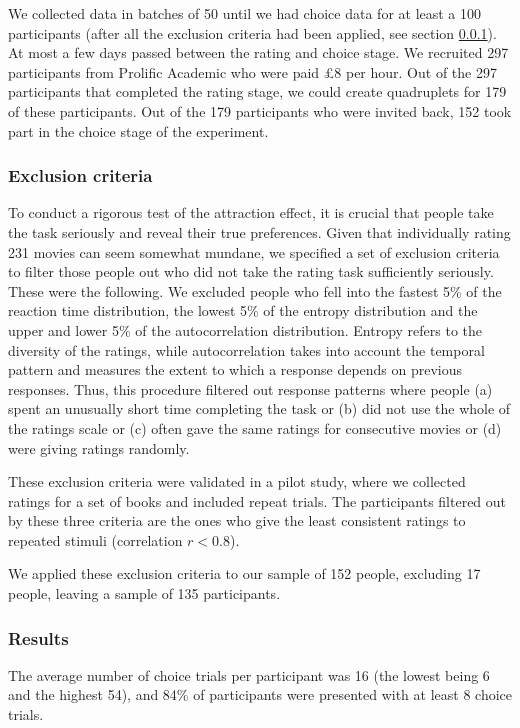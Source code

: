 \documentclass[12pt, a4paper]{article}
\begin{document}
We collected data in batches of 50 until we had choice data for at least a 100 participants (after all the exclusion criteria had been applied, see section \ref{exclusion_ref}). At most a few days passed between the rating and choice stage. We recruited 297 participants from Prolific Academic who were paid £8 per hour. Out of the 297 participants that completed the rating stage, we could create quadruplets for 179 of these participants. Out of the 179 participants who were invited back, 152 took part in the choice stage of the experiment.

\subsubsection{Exclusion criteria} \label{exclusion_ref}

To conduct a rigorous test of the attraction effect, it is crucial that people take the task seriously and reveal their true preferences. Given that individually rating 231 movies can seem somewhat mundane, we specified a set of exclusion criteria to filter those people out who did not take the rating task sufficiently seriously. These were the following. We excluded people who fell into the fastest 5\% of the reaction time distribution, the lowest 5\% of the entropy distribution and the upper and lower 5\% of the autocorrelation distribution. Entropy refers to the diversity of the ratings, while autocorrelation takes into account the temporal pattern and measures the extent to which a response depends on previous responses. Thus, this procedure filtered out response patterns where people (a) spent an unusually short time completing the task or (b) did not use the whole of the ratings scale or (c) often gave the same ratings for consecutive movies or (d) were giving ratings randomly.

These exclusion criteria were validated in a pilot study, where we collected ratings for a set of books and included repeat trials. The participants filtered out by these three criteria are the ones who give the least consistent ratings to repeated stimuli (correlation $r < 0.8$).

We applied these exclusion criteria to our sample of 152 people, excluding 17 people, leaving a sample of 135 participants.


\subsubsection{Results}

The average number of choice trials per participant was 16 (the lowest being 6 and the highest 54), and 84\% of participants were presented with at least 8 choice trials.
\end{document}
